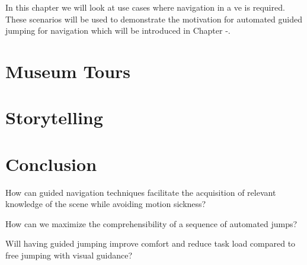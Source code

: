 \label{chapter:Guided Jumping Motivation}
In this chapter we will look at use cases where navigation in a \acrshort{ve} is required. These scenarios will be used to demonstrate the motivation for automated guided jumping for navigation which will be introduced in Chapter -. 

\section{Museum Tours}
\label{section:GJS Museum Tours}

\section{Storytelling}
\label{section:GJS Storytelling}

\section{Conclusion}
\label{section:GJS Conclusion}

\begin{researchq}
	\label{rq:rq1}
	How can guided navigation techniques facilitate the acquisition of relevant knowledge of the scene while avoiding motion sickness?
\end{researchq}
\begin{researchq}
	\label{rq:rq2}
	How can we maximize the comprehensibility of a sequence of automated jumps?
\end{researchq}
\begin{researchq}
	\label{rq:rq3}
	Will having guided jumping improve comfort and reduce task load compared to free jumping with visual guidance?
\end{researchq}
